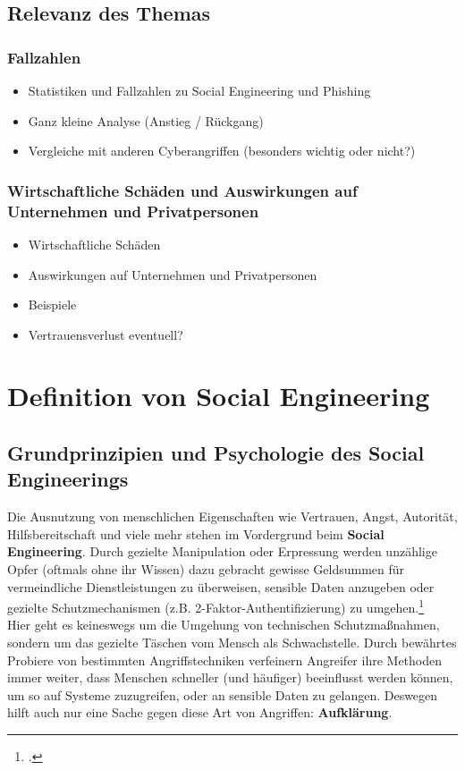 \documentclass[12pt, a4paper, oneside]{scrartcl}
\begin{document}
\subsection{Relevanz des Themas}

\subsubsection{Fallzahlen}
\begin{itemize}
  \item Statistiken und Fallzahlen zu Social Engineering und Phishing
  \item Ganz kleine Analyse (Anstieg / Rückgang)
  \item Vergleiche mit anderen Cyberangriffen (besonders wichtig oder nicht?)
\end{itemize}

\subsubsection{Wirtschaftliche Schäden und Auswirkungen auf Unternehmen und Privatpersonen}
\begin{itemize}
  \item Wirtschaftliche Schäden
  \item Auswirkungen auf Unternehmen und Privatpersonen
  \item Beispiele
  \item Vertrauensverlust eventuell?
\end{itemize}


\section{Definition von Social Engineering}

\subsection{Grundprinzipien und Psychologie des Social Engineerings}
Die Ausnutzung von menschlichen Eigenschaften wie Vertrauen, Angst, Autorität, Hilfsbereitschaft 
und viele mehr stehen im Vordergrund beim \textbf{Social Engineering}. Durch gezielte Manipulation
oder Erpressung werden unzählige Opfer (oftmals ohne ihr Wissen) dazu gebracht gewisse Geldsummen
für vermeindliche Dienstleistungen zu überweisen, sensible Daten anzugeben oder gezielte Schutzmechanismen
(z.B. 2-Faktor-Authentifizierung) zu umgehen.\footcite{BSISocialEngineering}\\
Hier geht es keineswegs um die Umgehung von technischen Schutzmaßnahmen, sondern um das gezielte
Täschen vom Mensch als Schwachstelle. Durch bewährtes Probiere von bestimmten Angriffstechniken
verfeinern Angreifer ihre Methoden immer weiter, dass Menschen schneller (und häufiger) beeinflusst
werden können, um so auf Systeme zuzugreifen, oder an sensible Daten zu gelangen.
Deswegen hilft auch nur eine Sache gegen diese Art von Angriffen: \textbf{Aufklärung}.\\
\end{document}
